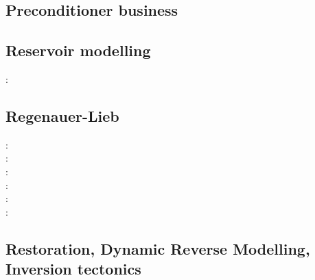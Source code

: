 \subsection{Preconditioner business}

\begin{scriptsize}
\cite{benz02}
\cite{bewa08}
\cite{urvs08}
\end{scriptsize}

\subsection{Reservoir modelling}

\begin{scriptsize}
\twothousandthirteen: \cite{orwa13}
\end{scriptsize}

\subsection{Regenauer-Lieb}

{\scriptsize
\twothousand: \cite{reyu00}\\
\twothousandthree: \cite{reyu03}\\
\twothousandfour: \cite{reyu04}\\
\twothousandsix: \cite{rehy06}\cite{rewr06}\\
\twothousandnine: \cite{reps09}\\
\twothousandthirteen: \cite{revp13}
}

\subsection{Restoration, Dynamic Reverse Modelling, Inversion tectonics}

